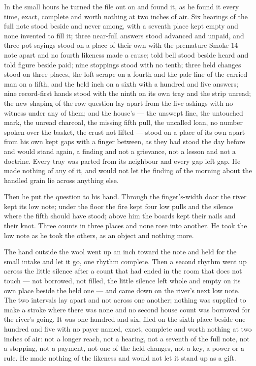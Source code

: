In the small hours he turned the file out on  and found it, as he found it every time, exact, complete and worth nothing at two inches of air. Six hearings of the full note stood beside and never among, with a seventh place kept empty and none invented to fill it; three near-full answers stood advanced and unpaid, and three pot sayings stood on a place of their own with the premature Smoke 14 note apart and no fourth likeness made a cause; told bell stood beside heard and told figure beside paid; nine stoppings stood with no tenth; three held changes stood on three places, the loft scrape on a fourth and the pale line of the carried man on a fifth, and the held inch on a sixth with a hundred and five answers; nine record-first hands stood with the ninth on its own tray and the strip unread; the new shaping of the row question lay apart from the five askings with no witness under any of them; and the house's  --- the unswept line, the untouched mark, the unread charcoal, the missing fifth pull, the uncalled loan, no number spoken over the basket, the crust not lifted --- stood on a place of its own apart from his own kept gaps with a finger between, as they had stood the day before and would stand again, a finding and not a grievance, not a lesson and not a doctrine. Every tray was parted from its neighbour and every gap left gap. He made nothing of any of it, and would not let the finding of the morning about the handled grain lie across anything else.

Then he put the question to his hand. Through the finger's-width door the river kept its low note; under the floor the fire kept four low pulls and the silence where the fifth should have stood; above him the boards kept their nails and their knot. Three counts in three places and none rose into another. He took the low note as he took the others, as an object and nothing more.

The hand outside the wool went up an inch toward the note and held for the small intake and let it go, one rhythm complete. Then a second rhythm went up across the little silence after a count that had ended in the room that does not touch --- not borrowed, not filled, the little silence left whole and empty on its own place beside the held one --- and came down on the river's next low note. The two intervals lay apart and not across one another; nothing was supplied to make a stroke where there was none and no second house count was borrowed for the river's going. It was one hundred and six, filed on the sixth place beside one hundred and five with no payer named, exact, complete and worth nothing at two inches of air: not a longer reach, not a hearing, not a seventh of the full note, not a stopping, not a payment, not one of the held changes, not a key, a power or a rule. He made nothing of the likeness and would not let it stand up as a gift.

